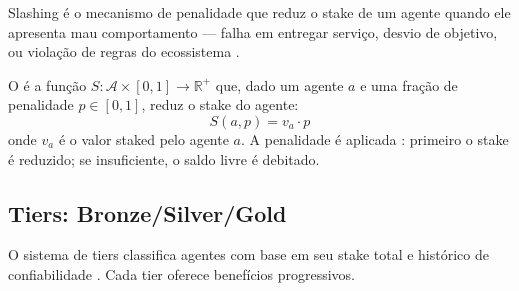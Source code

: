 Slashing é o mecanismo de penalidade que reduz o stake de um
agente quando ele apresenta mau comportamento — falha em entregar
serviço, desvio de objetivo, ou violação de regras do ecossistema
\cite{opencode2026token}.

\begin{definicao}[Slashing]
O  é a função $S: \mathcal{A} \times [0,1] \to
\mathbb{R}^+$ que, dado um agente $a$ e uma fração de penalidade
$p \in [0,1]$, reduz o stake do agente:
\[
S(a, p) = v_a \cdot p
\]
onde $v_a$ é o valor staked pelo agente $a$. A penalidade é
aplicada : primeiro o stake é reduzido;
se insuficiente, o saldo livre é debitado.
\end{definicao}

\subsection{Tiers: Bronze/Silver/Gold}

O sistema de tiers classifica agentes com base em seu stake total
e histórico de confiabilidade \cite{opencode2026token}. Cada tier
oferece benefícios progressivos.

\begin{table}[htb]
\centering
    \small
\caption{Sistema de tiers da SPEC-023}
\label{tab:tiers}
\end{table}

